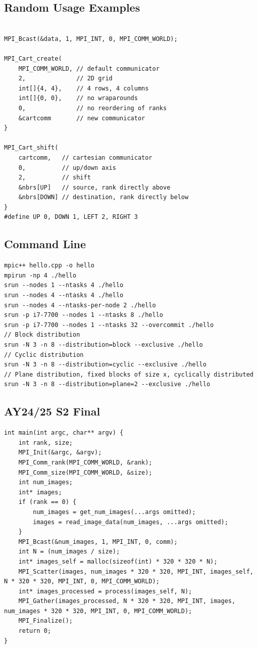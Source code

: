 \documentclass{article}
\begin{document}
\subsection{Random Usage Examples}
\begin{lstlisting}

MPI_Bcast(&data, 1, MPI_INT, 0, MPI_COMM_WORLD);

MPI_Cart_create(
    MPI_COMM_WORLD, // default communicator
    2,              // 2D grid
    int[]{4, 4},    // 4 rows, 4 columns
    int[]{0, 0},    // no wraparounds
    0,              // no reordering of ranks
    &cartcomm       // new communicator
}

MPI_Cart_shift(
    cartcomm,   // cartesian communicator
    0,          // up/down axis
    2,          // shift
    &nbrs[UP]   // source, rank directly above
    &nbrs[DOWN] // destination, rank directly below
}
#define UP 0, DOWN 1, LEFT 2, RIGHT 3

\end{lstlisting}

\subsection{Command Line}
\begin{lstlisting}
mpic++ hello.cpp -o hello
mpirun -np 4 ./hello
srun --nodes 1 --ntasks 4 ./hello
srun --nodes 4 --ntasks 4 ./hello
srun --nodes 4 --ntasks-per-node 2 ./hello
srun -p i7-7700 --nodes 1 --ntasks 8 ./hello
srun -p i7-7700 --nodes 1 --ntasks 32 --overcommit ./hello
// Block distribution
srun -N 3 -n 8 --distribution=block --exclusive ./hello
// Cyclic distribution
srun -N 3 -n 8 --distribution=cyclic --exclusive ./hello
// Plane distribution, fixed blocks of size x, cyclically distributed
srun -N 3 -n 8 --distribution=plane=2 --exclusive ./hello
\end{lstlisting}

\subsection{AY24/25 S2 Final}
\begin{lstlisting}
int main(int argc, char** argv) {
    int rank, size;
    MPI_Init(&argc, &argv);
    MPI_Comm_rank(MPI_COMM_WORLD, &rank);
    MPI_Comm_size(MPI_COMM_WORLD, &size);
    int num_images;
    int* images;
    if (rank == 0) {
        num_images = get_num_images(...args omitted);
        images = read_image_data(num_images, ...args omitted);
    }
    MPI_Bcast(&num_images, 1, MPI_INT, 0, comm);
    int N = (num_images / size);
    int* images_self = malloc(sizeof(int) * 320 * 320 * N);
    MPI_Scatter(images, num_images * 320 * 320, MPI_INT, images_self, N * 320 * 320, MPI_INT, 0, MPI_COMM_WORLD);
    int* images_processed = process(images_self, N);
    MPI_Gather(images_processed, N * 320 * 320, MPI_INT, images, num_images * 320 * 320, MPI_INT, 0, MPI_COMM_WORLD);
    MPI_Finalize();
    return 0;
}
\end{lstlisting}
\end{document}
